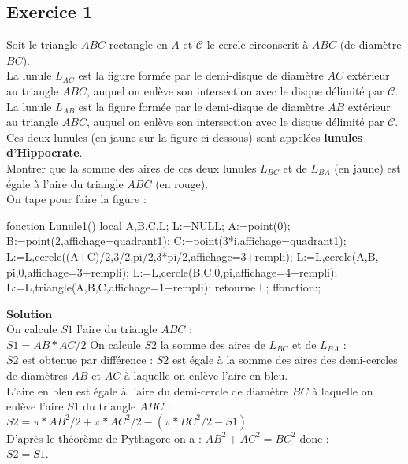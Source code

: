 \documentclass[12pt,a4paper]{book}
\begin{document}
\begin{giacjshere}
\subsection{Exercice 1}
Soit le triangle $ABC$ rectangle en $A$ et $\mathcal{C}$ le cercle circonscrit 
à $ABC$ (de diamètre $BC$).\\
La lunule $L_{AC}$ est la figure form\'ee par le demi-disque de diamètre $AC$ 
ext\'erieur au triangle $ABC$, auquel on enlève son intersection avec le disque 
d\'elimit\'e par $\mathcal{C}$.\\
La lunule $L_{AB}$ est la figure form\'ee par le demi-disque de diamètre $AB$ 
ext\'erieur au triangle $ABC$, auquel on enl\`eve son intersection avec le 
disque d\'elimit\'e par $\mathcal{C}$.\\
Ces deux lunules (en jaune sur la figure ci-dessous) sont appel\'ees 
{\bf lunules d'Hippocrate}.\\
Montrer que la somme des aires de ces deux lunules $L_{BC}$ et de $L_{BA}$ (en 
jaune) est \'egale à l'aire du triangle $ABC$ (en rouge).\\
On tape pour faire la figure :
\begin{giaconload}
fonction Lunule1()
local A,B,C,L;
L:=NULL;
A:=point(0);
B:=point(2,affichage=quadrant1);
C:=point(3*i,affichage=quadrant1);
L:=L,cercle((A+C)/2,3/2,pi/2,3*pi/2,affichage=3+rempli);
L:=L,cercle(A,B,-pi,0,affichage=3+rempli);
L:=L,cercle(B,C,0,pi,affichage=4+rempli);
L:=L,triangle(A,B,C,affichage=1+rempli);
retourne L;
ffonction:;
\end{giaconload}

{\bf Solution}\\
On calcule $S1$ l'aire du triangle $ABC$ :\\
$S1=AB*AC/2$
On calcule $S2$ la somme des aires de $L_{BC}$ et de $L_{BA}$ :\\
$S2$ est obtenue par diff\'erence : $S2$ est \'egale \`a la somme des aires des
demi-cercles de diam\`etres $AB$ et $AC$ \`a laquelle on enl\`eve l'aire en 
bleu.\\
L'aire en bleu est \'egale \`a l'aire du demi-cercle de 
diam\`etre $BC$ \`a laquelle on enl\`eve l'aire $S1$ du triangle $ABC$ :\\
$S2=\pi*AB^2/2+\pi*AC^2/2-(\pi*BC^2/2-S1)$\\
D'apr\`es le th\'eor\`eme de Pythagore on a  : $AB^2+AC^2=BC^2$ donc :\\
$S2=S1$.

\end{giacjshere}
\end{document}
